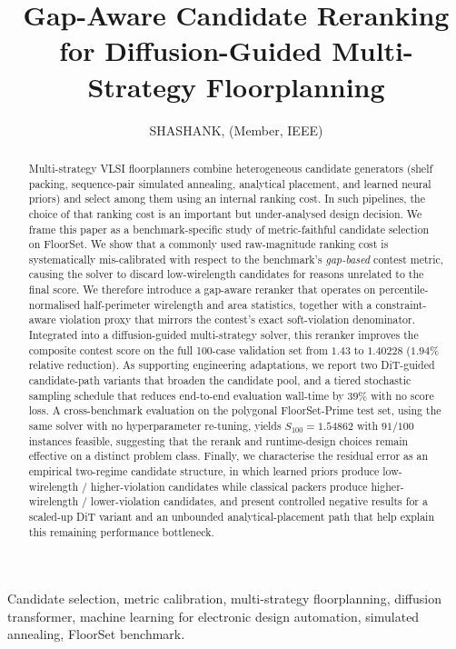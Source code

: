 \documentclass[nolineno]{ieeeaccess}
\title{Gap-Aware Candidate Reranking for Diffusion-Guided Multi-Strategy Floorplanning}
\author{\uppercase{Shashank}\authorrefmark{1}, {(Member, IEEE)}}
\begin{document}
\begin{abstract}
Multi-strategy VLSI floorplanners combine heterogeneous candidate
generators (shelf packing, sequence-pair simulated annealing,
analytical placement, and learned neural priors) and select among
them using an internal ranking cost. In such pipelines, the choice of
that ranking cost is an important but under-analysed design decision.
We frame this paper as a benchmark-specific study of
metric-faithful candidate selection on FloorSet. We show that a
commonly used raw-magnitude
ranking cost is systematically mis-calibrated with respect to the
benchmark's \emph{gap-based} contest metric, causing the solver to
discard low-wirelength candidates for reasons unrelated to the final
score. We therefore introduce a gap-aware reranker that operates on
percentile-normalised half-perimeter wirelength and area statistics,
together with a constraint-aware violation proxy that mirrors the
contest's exact soft-violation denominator. Integrated into a
diffusion-guided multi-strategy solver, this reranker improves the
composite contest score on the full 100-case validation set from
$1.43$ to $1.40228$ ($1.94\%$ relative reduction). As supporting
engineering adaptations, we report two DiT-guided candidate-path
variants that broaden the candidate pool, and a tiered stochastic
sampling schedule that reduces end-to-end evaluation wall-time by
$39\%$ with no score loss. A cross-benchmark evaluation on the
polygonal FloorSet-Prime test set, using the same solver with no
hyperparameter re-tuning, yields $S_{100}=1.54862$ with $91/100$
instances feasible, suggesting that the rerank and runtime-design
choices remain effective on a distinct problem class. Finally, we
characterise the residual error as an empirical two-regime candidate
structure, in which learned priors produce low-wirelength /
higher-violation candidates while classical packers produce
higher-wirelength / lower-violation candidates, and present
controlled negative results for a scaled-up DiT variant and an
unbounded analytical-placement path that help explain this remaining
performance bottleneck.
\end{abstract}

\begin{keywords}
Candidate selection, metric calibration, multi-strategy floorplanning,
diffusion transformer, machine learning for electronic design
automation, simulated annealing, FloorSet benchmark.
\end{keywords}

\titlepgskip=0pt
\maketitle
\end{document}
